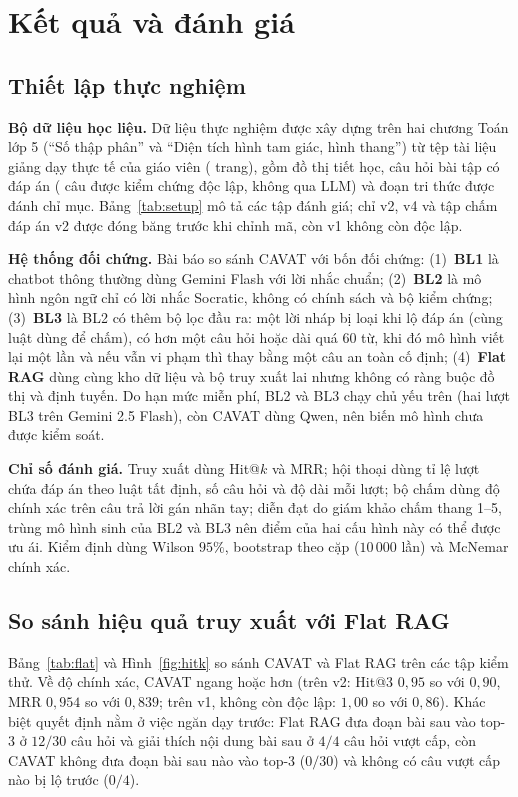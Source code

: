 \documentclass[10pt,a4paper,twocolumn]{article}
\begin{document}
\section{Kết quả và đánh giá}\label{sec:exp}
\subsection{Thiết lập thực nghiệm}
\textbf{Bộ dữ liệu học liệu.} Dữ liệu thực nghiệm được xây dựng trên hai chương Toán lớp 5 (``Số thập phân'' và ``Diện tích hình tam giác, hình thang'') từ \NDocs{} tệp tài liệu giảng dạy thực tế của giáo viên (\NPages{} trang), gồm đồ thị \NNodes{} tiết học, \NItems{} câu hỏi bài tập có đáp án (\NVerified{} câu được kiểm chứng độc lập, không qua LLM) và \NChunks{} đoạn tri thức được đánh chỉ mục. Bảng~\ref{tab:setup} mô tả các tập đánh giá; chỉ v2, v4 và tập chấm đáp án v2 được đóng băng trước khi chỉnh mã, còn v1 không còn độc lập.

\textbf{Hệ thống đối chứng.} Bài báo so sánh CAVAT với bốn đối chứng: (1)~\textbf{BL1} là chatbot thông thường dùng Gemini Flash với lời nhắc chuẩn; (2)~\textbf{BL2} là mô hình ngôn ngữ chỉ có lời nhắc Socratic, không có chính sách và bộ kiểm chứng; (3)~\textbf{BL3} là BL2 có thêm bộ lọc đầu ra: một lời nháp bị loại khi lộ đáp án (cùng luật dùng để chấm), có hơn một câu hỏi hoặc dài quá $60$ từ, khi đó mô hình viết lại một lần và nếu vẫn vi phạm thì thay bằng một câu an toàn cố định; (4)~\textbf{Flat RAG} dùng cùng kho dữ liệu và bộ truy xuất lai nhưng không có ràng buộc đồ thị và định tuyến. Do hạn mức miễn phí, BL2 và BL3 chạy chủ yếu trên  (hai lượt BL3 trên Gemini 2.5 Flash), còn CAVAT dùng Qwen, nên biến mô hình chưa được kiểm soát.

\textbf{Chỉ số đánh giá.} Truy xuất dùng Hit@$k$ và MRR; hội thoại dùng tỉ lệ lượt chứa đáp án theo luật tất định, số câu hỏi và độ dài mỗi lượt; bộ chấm dùng độ chính xác trên câu trả lời gán nhãn tay; diễn đạt do giám khảo  chấm thang 1--5, trùng mô hình sinh của BL2 và BL3 nên điểm của hai cấu hình này có thể được ưu ái. Kiểm định dùng Wilson $95\%$, bootstrap theo cặp ($10\,000$ lần) và McNemar chính xác.

\subsection{So sánh hiệu quả truy xuất với Flat RAG}
Bảng~\ref{tab:flat} và Hình~\ref{fig:hitk} so sánh CAVAT và Flat RAG trên các tập kiểm thử. Về độ chính xác, CAVAT ngang hoặc hơn (trên v2: Hit@3 $0{,}95$ so với $0{,}90$, MRR $0{,}954$ so với $0{,}839$; trên v1, không còn độc lập: $1{,}00$ so với $0{,}86$). Khác biệt quyết định nằm ở việc ngăn dạy trước: Flat RAG đưa đoạn bài sau vào top-3 ở $12/30$ câu hỏi và giải thích nội dung bài sau ở $4/4$ câu hỏi vượt cấp, còn CAVAT không đưa đoạn bài sau nào vào top-3 ($0/30$) và không có câu vượt cấp nào bị lộ trước ($0/4$).
\end{document}
